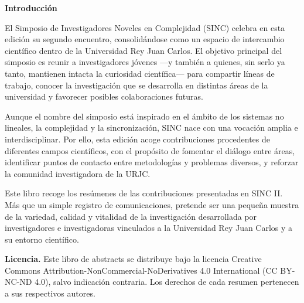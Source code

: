 \documentclass[11pt,a4paper]{article}
\begin{document}
\clearpage

\clearpage

\clearpage
{}
{}

\thispagestyle{plain}

\vspace*{1.0cm}

\begin{center}
    {\Huge\bfseries Introducción}
\end{center}

\vspace*{2.5cm}

\begin{center}
\begin{minipage}{0.82\textwidth}
\large

El Simposio de Investigadores Noveles en Complejidad (SINC) celebra en esta edición su segundo encuentro, consolidándose como un espacio de intercambio científico dentro de la Universidad Rey Juan Carlos. El objetivo principal del simposio es reunir a investigadores jóvenes —y también a quienes, sin serlo ya tanto, mantienen intacta la curiosidad científica— para compartir líneas de trabajo, conocer la investigación que se desarrolla en distintas áreas de la universidad y favorecer posibles colaboraciones futuras.

\vspace{0.7em}

Aunque el nombre del simposio está inspirado en el ámbito de los sistemas no lineales, la complejidad y la sincronización, SINC nace con una vocación amplia e interdisciplinar. Por ello, esta edición acoge contribuciones procedentes de diferentes campos científicos, con el propósito de fomentar el diálogo entre áreas, identificar puntos de contacto entre metodologías y problemas diversos, y reforzar la comunidad investigadora de la URJC.

\vspace{0.7em}

Este libro recoge los resúmenes de las contribuciones presentadas en SINC II. Más que un simple registro de comunicaciones, pretende ser una pequeña muestra de la variedad, calidad y vitalidad de la investigación desarrollada por investigadores e investigadoras vinculados a la Universidad Rey Juan Carlos y a su entorno científico.

\vspace{1.4em}

{\normalsize
\noindent\textbf{Licencia.} Este libro de abstracts se distribuye bajo la licencia Creative Commons Attribution-NonCommercial-NoDerivatives 4.0 International (CC BY-NC-ND 4.0), salvo indicación contraria. Los derechos de cada resumen pertenecen a sus respectivos autores.
}


\end{minipage}
\end{center}
\end{document}
